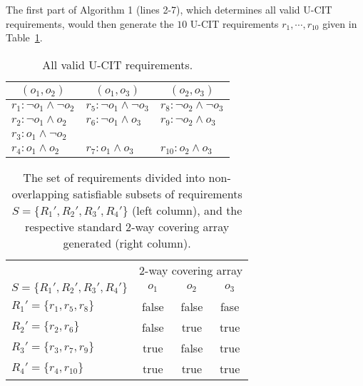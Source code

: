 \documentclass[EPiCempty]{easychair}
\begin{document}
The first part of Algorithm 1 (lines 2-7), which  determines all valid U-CIT requirements, would then generate the $10$ U-CIT requirements $r_1,  \cdots, r_{10}$ given in Table~\ref{tbl:requirements}.

\begin{table}[t]
\centering
\begin{tabular}{|l|l|l|}
\hline
\multicolumn{1}{|c}{$(o_1, o_2)$} & \multicolumn{1}{|c}{$(o_1, o_3)$} & \multicolumn{1}{|c|}{$(o_2, o_3)$} \\
\hline
\hline
$r_1: \neg o_1 \wedge \neg o_2$ & $r_5: \neg o_1 \wedge \neg o_3$  & $r_8: \neg o_2 \wedge \neg o_3$  \\
$r_2: \neg o_1 \wedge o_2$ & $r_6: \neg o_1 \wedge o_3$  & $r_9: \neg o_2 \wedge o_3$  \\
$r_3: o_1 \wedge \neg o_2$ &  &    \\
$r_4: o_1 \wedge o_2$ & $r_7: o_1 \wedge o_3$  & $r_{10}: o_2 \wedge o_3$ \\
\hline
\end{tabular}
\caption{All valid U-CIT requirements.}
\label{tbl:requirements}
\end{table}

\begin{table}[h]
\centering
\begin{tabular}{|l|ccc|} 
\hline
     & \multicolumn{3}{c|}{$2$-way covering array} \\ 
\multicolumn{1}{|c|}{$S = \{R_1', R_2', R_3', R_4'\}$} & $o_1$ & $o_2$ & $o_3$ \\ 
\hline
\hline
$R_1' = \{r_1, r_5, r_8 \}$  & false & false & fase \\
$R_2' = \{r_2, r_6\}$        & false & true  & true \\
$R_3' = \{r_3, r_7, r_9 \}$  & true  & false & true \\
$R_4' = \{r_4, r_{10} \}$    & true  & true  & true \\
\hline
\end{tabular}
\caption{The set of requirements divided into non-overlapping satisfiable subsets of requirements $S=\{R_1', R_2', R_3', R_4'\}$ (left column), and the respective standard $2$-way covering array generated (right column).}
\label{tbl:output}
\end{table}
\end{document}
